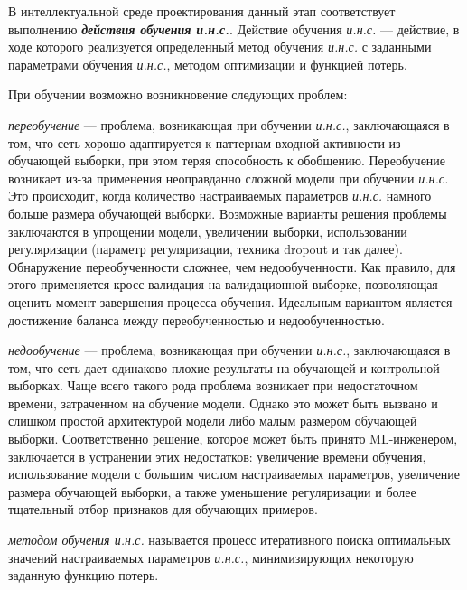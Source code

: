 В интеллектуальной среде проектирования данный этап соответствует выполнению \textbf{\textit{действия обучения и.н.с.}}. Действие обучения \textit{и.н.с.} --- действие, в ходе которого реализуется определенный метод обучения \textit{и.н.с.} с заданными параметрами обучения \textit{и.н.с.}, методом оптимизации и функцией потерь.

При обучении возможно возникновение следующих проблем:

\begin{textitemize}
	\item \textit{переобучение} --- проблема, возникающая при обучении \textit{и.н.с.}, заключающаяся в том,
	что сеть хорошо адаптируется к паттернам входной активности из обучающей выборки, при этом теряя способность к обобщению.
	Переобучение возникает из-за применения неоправданно сложной модели при обучении \textit{и.н.с.} Это происходит,
	когда количество настраиваемых параметров \textit{и.н.с.} намного больше размера обучающей выборки. Возможные
	варианты решения проблемы заключаются в упрощении модели, увеличении выборки, использовании регуляризации
	(параметр регуляризации, техника dropout и так далее).\\
	Обнаружение переобученности сложнее, чем недообученности. Как правило, для этого применяется
	кросс-валидация на валидационной выборке, позволяющая оценить момент завершения процесса обучения.
	Идеальным вариантом является достижение баланса между переобученностью и недообученностью.

	\item \textit{недообучение} --- проблема, возникающая при обучении  \textit{и.н.с.}, заключающаяся в том,
	что сеть дает одинаково плохие результаты на обучающей и контрольной выборках.
	Чаще всего такого рода проблема возникает при недостаточном времени, затраченном на обучение модели.
	Однако это может быть вызвано и слишком простой архитектурой модели либо малым размером обучающей
	выборки. Соответственно решение, которое может быть принято ML-инженером, заключается в устранении
	этих недостатков: увеличение времени обучения, использование модели с большим числом настраиваемых
	параметров, увеличение размера обучающей выборки, а также уменьшение регуляризации и более тщательный
	отбор признаков для обучающих примеров.
\end{textitemize}

\textit{методом обучения \textit{и.н.с.}} называется процесс итеративного поиска оптимальных значений настраиваемых параметров \textit{и.н.с.}, минимизирующих некоторую заданную функцию потерь.

